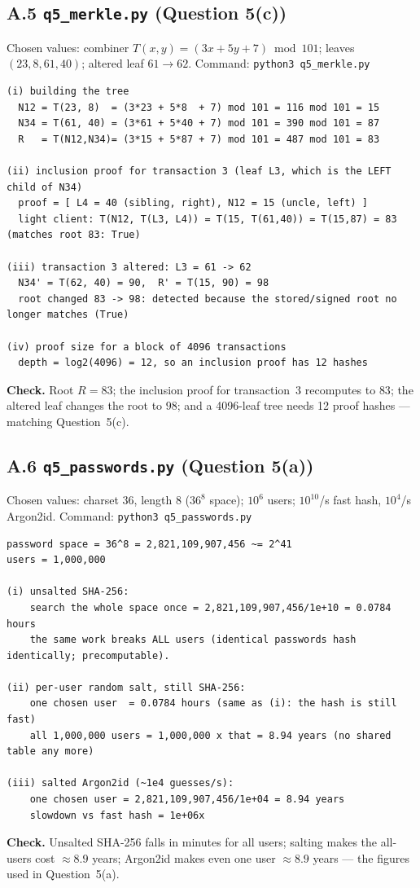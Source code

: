 \documentclass[11pt,a4paper]{article}
\begin{document}
\subsection*{A.5 \texttt{q5\_merkle.py} (Question 5(c))}
Chosen values: combiner $T(x,y)=(3x+5y+7)\bmod 101$; leaves $(23,8,61,40)$; altered leaf $61\to 62$.
Command: \texttt{python3 q5\_merkle.py}
\begin{Verbatim}[fontsize=\footnotesize, frame=single]
(i) building the tree
  N12 = T(23, 8)  = (3*23 + 5*8  + 7) mod 101 = 116 mod 101 = 15
  N34 = T(61, 40) = (3*61 + 5*40 + 7) mod 101 = 390 mod 101 = 87
  R   = T(N12,N34)= (3*15 + 5*87 + 7) mod 101 = 487 mod 101 = 83

(ii) inclusion proof for transaction 3 (leaf L3, which is the LEFT child of N34)
  proof = [ L4 = 40 (sibling, right), N12 = 15 (uncle, left) ]
  light client: T(N12, T(L3, L4)) = T(15, T(61,40)) = T(15,87) = 83  (matches root 83: True)

(iii) transaction 3 altered: L3 = 61 -> 62
  N34' = T(62, 40) = 90,  R' = T(15, 90) = 98
  root changed 83 -> 98: detected because the stored/signed root no longer matches (True)

(iv) proof size for a block of 4096 transactions
  depth = log2(4096) = 12, so an inclusion proof has 12 hashes
\end{Verbatim}
\textbf{Check.} Root $R=83$; the inclusion proof for transaction~3 recomputes to $83$; the altered leaf
changes the root to $98$; and a 4096-leaf tree needs 12 proof hashes --- matching Question~5(c).

\subsection*{A.6 \texttt{q5\_passwords.py} (Question 5(a))}
Chosen values: charset $36$, length $8$ ($36^8$ space); $10^6$ users; $10^{10}$/s fast hash,
$10^{4}$/s Argon2id. Command: \texttt{python3 q5\_passwords.py}
\begin{Verbatim}[fontsize=\footnotesize, frame=single]
password space = 36^8 = 2,821,109,907,456 ~= 2^41
users = 1,000,000

(i) unsalted SHA-256:
    search the whole space once = 2,821,109,907,456/1e+10 = 0.0784 hours
    the same work breaks ALL users (identical passwords hash identically; precomputable).

(ii) per-user random salt, still SHA-256:
    one chosen user  = 0.0784 hours (same as (i): the hash is still fast)
    all 1,000,000 users = 1,000,000 x that = 8.94 years (no shared table any more)

(iii) salted Argon2id (~1e4 guesses/s):
    one chosen user = 2,821,109,907,456/1e+04 = 8.94 years
    slowdown vs fast hash = 1e+06x
\end{Verbatim}
\textbf{Check.} Unsalted SHA-256 falls in minutes for all users; salting makes the all-users cost
$\approx 8.9$ years; Argon2id makes even one user $\approx 8.9$ years --- the figures used in
Question~5(a).
\end{document}

